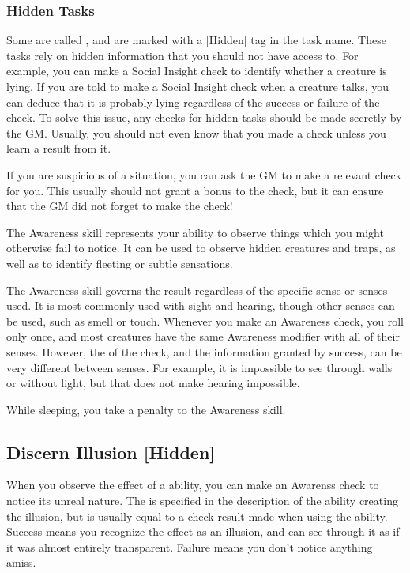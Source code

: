     \subsubsection{Hidden Tasks}\label{Hidden Tasks}
        Some  are called , and are marked with a [Hidden] tag in the task name.
        These tasks rely on hidden information that you should not have access to.
        For example, you can make a Social Insight check to identify whether a creature is lying.
        If you are told to make a Social Insight check when a creature talks, you can deduce that it is probably lying regardless of the success or failure of the check.
        To solve this issue, any checks for hidden tasks should be made secretly by the GM.\@
        Usually, you should not even know that you made a check unless you learn a result from it.

        If you are suspicious of a situation, you can ask the GM to make a relevant check for you.
        This usually should not grant a bonus to the check, but it can ensure that the GM did not forget to make the check!

\newpage
{}
    The Awareness skill represents your ability to observe things which you might otherwise fail to notice.
    It can be used to observe hidden creatures and traps, as well as to identify fleeting or subtle sensations. 

    The Awareness skill governs the result regardless of the specific sense or senses used.
    It is most commonly used with sight and hearing, though other senses can be used, such as smell or touch.
    Whenever you make an Awareness check, you roll only once, and most creatures have the same Awareness modifier with all of their senses.
    However, the  of the check, and the information granted by success, can be very different between senses.
    For example, it is impossible to see through walls or without light, but that does not make hearing impossible.

    While sleeping, you take a  penalty to the Awareness skill.

    \subsection{Discern Illusion [Hidden]}
        When you observe the effect of a  ability, you can make an Awarenss check to notice its unreal nature.
        The  is specified in the description of the ability creating the illusion, but is usually equal to a check result made when using the ability.
        Success means you recognize the effect as an illusion, and can see through it as if it was almost entirely transparent.
        Failure means you don't notice anything amiss.

